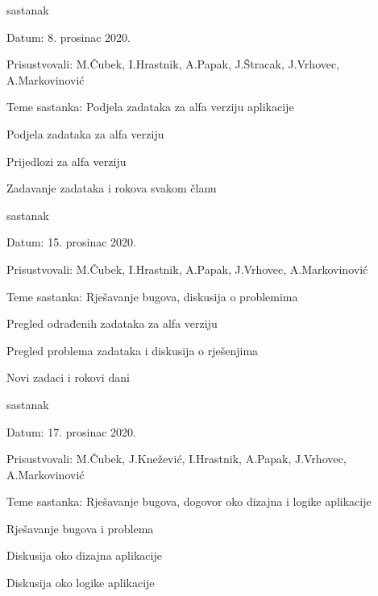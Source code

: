 \begin{packed_enum}
			\item  sastanak
			\item[] \begin{packed_item}
				\item Datum: 8. prosinac 2020.
				\item Prisustvovali: M.Čubek, I.Hrastnik, A.Papak, J.Štracak, J.Vrhovec, A.Markovinović
				\item Teme sastanka: Podjela zadataka za alfa verziju aplikacije
				\begin{packed_item}
					\item Podjela zadataka za alfa verziju
					\item Prijedlozi za alfa verziju
					\item Zadavanje zadataka i rokova svakom članu
					\item
				\end{packed_item}
			\end{packed_item}
			
			\item  sastanak
			\item[] \begin{packed_item}
				\item Datum: 15. prosinac 2020.
				\item Prisustvovali: M.Čubek, I.Hrastnik, A.Papak, J.Vrhovec, A.Markovinović
				\item Teme sastanka: Rješavanje bugova, diskusija o problemima
				\begin{packed_item}
					\item Pregled odrađenih zadataka za alfa verziju
					\item Pregled problema zadataka i diskusija o rješenjima
					\item Novi zadaci i rokovi dani
				\end{packed_item}
			\end{packed_item}
			
			\item  sastanak
			\item[] \begin{packed_item}
				\item Datum: 17. prosinac 2020.
				\item Prisustvovali: M.Čubek, J.Knežević, I.Hrastnik, A.Papak,  J.Vrhovec, A.Markovinović
				\item Teme sastanka: Rješavanje bugova, dogovor oko dizajna i logike aplikacije
				\begin{packed_item}
					\item Rješavanje bugova i problema
					\item Diskusija oko dizajna aplikacije
					\item Diskusija oko logike aplikacije
				\end{packed_item}
			\end{packed_item}
		

\end{packed_enum}
